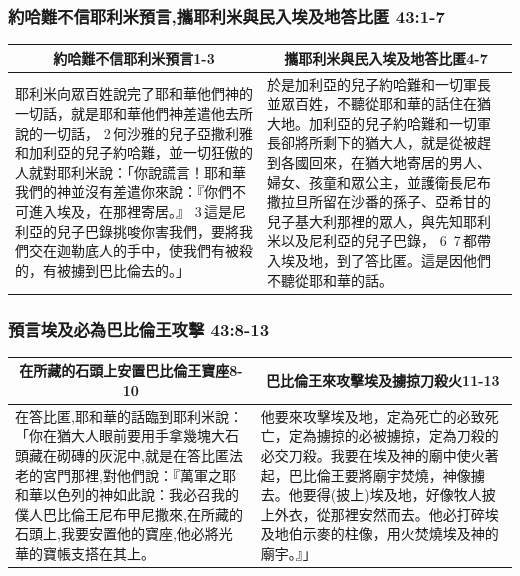 \subsubsection{約哈難不信耶利米預言,攜耶利米與民入埃及地答比匿 43:1-7}
\begin{table}[H]
\centering
\begin{tabular}{p{8.5cm}|p{9.0cm}}\hline\hline
\multicolumn{1}{c|}{約哈難不信耶利米預言1-3}&\multicolumn{1}{c}{攜耶利米與民入埃及地答比匿4-7}\\\hline
耶利米向眾百姓說完了耶和華他們神的一切話，就是耶和華他們神差遣他去所說的一切話， 2 何沙雅的兒子亞撒利雅和加利亞的兒子約哈難，並一切狂傲的人就對耶利米說：「你說謊言！耶和華我們的神並沒有差遣你來說：『你們不可進入埃及，在那裡寄居。』 3 這是尼利亞的兒子巴錄挑唆你害我們，要將我們交在迦勒底人的手中，使我們有被殺的，有被擄到巴比倫去的。」
&於是加利亞的兒子約哈難和一切軍長並眾百姓，不聽從耶和華的話住在猶大地。加利亞的兒子約哈難和一切軍長卻將所剩下的猶大人，就是從被趕到各國回來，在猶大地寄居的男人、婦女、孩童和眾公主，並護衛長尼布撒拉旦所留在沙番的孫子、亞希甘的兒子基大利那裡的眾人，與先知耶利米以及尼利亞的兒子巴錄， 6  7 都帶入埃及地，到了答比匿。這是因他們不聽從耶和華的話。\\\hline
\end{tabular}
\end{table}




\subsubsection{預言埃及必為巴比倫王攻擊 43:8-13}
\begin{table}[H]
\centering
\begin{tabular}{p{8.85cm}|p{8.65cm}}\hline\hline
\multicolumn{1}{c|}{在所藏的石頭上安置巴比倫王寶座8-10}&\multicolumn{1}{c}{巴比倫王來攻擊埃及擄掠刀殺火11-13}\\\hline
在答比匿,耶和華的話臨到耶利米說：「你在猶大人眼前要用手拿幾塊大石頭藏在砌磚的灰泥中,就是在答比匿法老的宮門那裡,對他們說：『萬軍之耶和華以色列的神如此說：我必召我的僕人巴比倫王尼布甲尼撒來,在所藏的石頭上,我要安置他的寶座,他必將光華的寶帳支搭在其上。
&他要來攻擊埃及地，定為死亡的必致死亡，定為擄掠的必被擄掠，定為刀殺的必交刀殺。我要在埃及神的廟中使火著起，巴比倫王要將廟宇焚燒，神像擄去。他要得(披上)埃及地，好像牧人披上外衣，從那裡安然而去。他必打碎埃及地伯示麥的柱像，用火焚燒埃及神的廟宇。』」\\\hline
\end{tabular}
\end{table}

